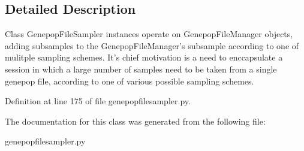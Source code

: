\subsection{Detailed Description}
\begin{DoxyVerb}Class GenepopFileSampler instances operate on GenepopFileManager objects,
adding subsamples to the GenepopFileManager's subsample according to one of
mulitple sampling schemes.  It's chief motivation is a need to enccapsulate 
a session in which a large number of samples need to be taken from a single
genepop file, according to one of various possible sampling schemes.
\end{DoxyVerb}
 

Definition at line 175 of file genepopfilesampler.\+py.



The documentation for this class was generated from the following file\+:\begin{DoxyCompactItemize}
\item 
genepopfilesampler.\+py\end{DoxyCompactItemize}

